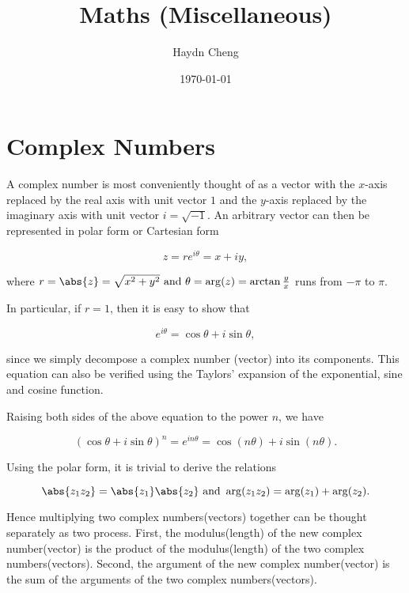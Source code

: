\documentclass[english,a4paper,12pt]{report}
\title{Maths (Miscellaneous)}
\author{Haydn Cheng}
\date{\today}
\begin{document}
\maketitle
\tableofcontents

\chapter{Complex Numbers}

A complex number is most conveniently thought of as a vector with the \(x\)-axis replaced by the real axis with unit vector \(1\) and the \(y\)-axis replaced by the imaginary axis with unit vector \(i = \sqrt{-1} \). An arbitrary vector can then be represented in polar form or Cartesian form

\begin{equation}
	z = re^{i \theta } = x + iy, 
\end{equation}

where \(r = \abs{z} = \sqrt{x^2 + y^2} \text { and } \theta = \arg (z) = \arctan {\frac{y}{x} }\) runs from \(-\pi \) to \(\pi \). 

In particular, if \(r=1\), then it is easy to show that 

\begin{equation}
	e^{i \theta } = \cos \theta + i\sin \theta ,
\end{equation}

since we simply decompose a complex number (vector) into its components. This equation can also be verified using the Taylors' expansion of the exponential, sine and cosine function.

Raising both sides of the above equation to the power \(n\), we have

\begin{equation}
	(\cos \theta + i \sin \theta )^{n} = e^{i n \theta } = \cos (n \theta ) + i \sin (n \theta ).
\end{equation}

Using the polar form, it is trivial to derive the relations

\begin{equation}
	\abs{z_1 z_2 } = \abs{z_1 }\abs{z_2 } \text { and } \arg (z_1 z_2 ) = \arg (z_1 ) + \arg (z_2 ).
\end{equation}

Hence multiplying two complex numbers(vectors) together can be thought separately as two process. First, the modulus(length) of the new complex number(vector) is the product of the modulus(length) of the two complex numbers(vectors). Second, the argument of the new complex number(vector) is the sum of the arguments of the two complex numbers(vectors).
\end{document}
